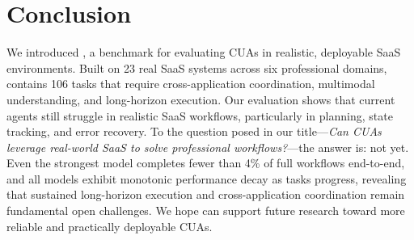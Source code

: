 \section{Conclusion}
\label{con}

We introduced \datasetname, a benchmark for evaluating CUAs in realistic, deployable SaaS environments. Built on 23 real SaaS systems across six professional domains, \datasetname contains 106 tasks that require cross-application coordination, multimodal understanding, and long-horizon execution. Our evaluation shows that current agents still struggle in realistic SaaS workflows, particularly in planning, state tracking, and error recovery. To the question posed in our title---\emph{Can CUAs leverage real-world SaaS to solve professional workflows?}---the answer is: not yet. Even the strongest model completes fewer than 4\% of full workflows end-to-end, and all models exhibit monotonic performance decay as tasks progress, revealing that sustained long-horizon execution and cross-application coordination remain fundamental open challenges. We hope \datasetname can support future research toward more reliable and practically deployable CUAs.
